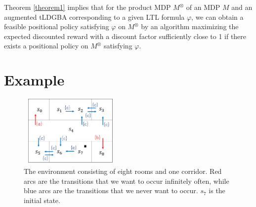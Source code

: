 \documentclass[letterpaper, 10 pt, conference]{ieeeconf}  %
\begin{document}
Theorem \ref{theorem1} implies that for the product MDP $M^{\otimes}$ of an MDP $M$ and an augmented tLDGBA corresponding to a given LTL formula $\varphi$, we can obtain a feasible positional policy satisfying $\varphi$ on $M^{\otimes}$ by an algorithm maximizing the expected discounted reward with a discount factor sufficiently close to 1 if there exists a positional policy on $M^{\otimes}$ satisfying $\varphi$.


\section{Example}

\begin{figure}[bp]
    \centering
    \includegraphics[bb=0 0 377 290,height=3.5cm,width=5cm]{MDP_corridor.png}
    \caption{The environment consisting of eight rooms and one corridor. Red arcs are the transitions that we want to occur infinitely often, while blue arcs are the transitions that we never want to occur. $s_7$ is the initial state.}
    \label{Grid1}
\end{figure}
\end{document}
